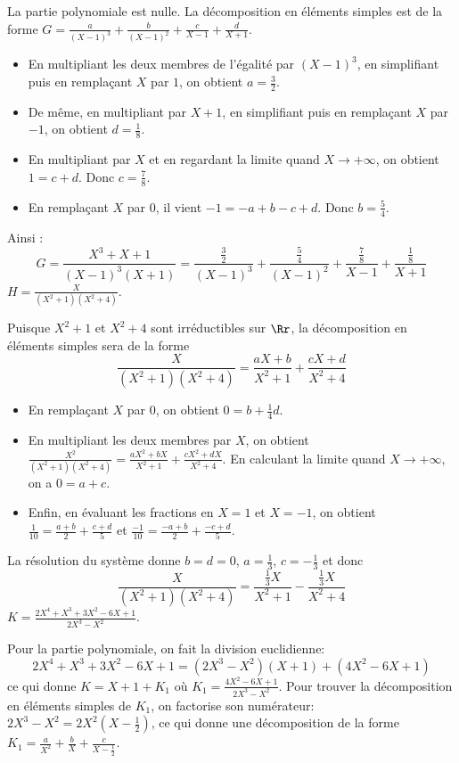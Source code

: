 {\begin{enumerate}
{La partie polynomiale est nulle. La décomposition en éléments simples est de la forme
$G=\frac{a}{(X-1)^3}+\frac{b}{(X-1)^2}+\frac{c}{X-1}+\frac{d}{X+1}$.

\begin{itemize}
\item En multipliant les deux membres de l'égalité par $(X-1)^3$, 
en simplifiant puis en remplaçant $X$ par $1$, 
on obtient $a=\frac32$.
\item De même, en multipliant par $X+1$, 
en simplifiant puis en remplaçant $X$ par $-1$, 
on obtient $d=\frac18$.
\item En multipliant par $X$ et en regardant la limite 
  quand $X\to +\infty$, on obtient $1=c+d$. Donc $c=\frac78$.
\item En remplaçant $X$ par $0$, il vient $-1=-a+b-c+d$.
  Donc $b = \frac54$.
\end{itemize}

Ainsi :
$$G = \frac{X^3+X+1}{(X-1)^3(X+1)} = \frac{\tfrac32}{(X-1)^3} + \frac{\tfrac54}{(X-1)^2} 
+ \frac{\tfrac78}{X-1}  + \frac{\tfrac18}{X+1}$$
$H=\frac{X}{(X^2+1)(X^2+4)}$.

Puisque $X^2+1$ et $X^2+4$ sont irréductibles sur $\Rr$, la décomposition en éléments simples sera de la forme 
$$\frac{X}{(X^2+1)(X^2+4)} = \frac{aX+b}{X^2+1} + \frac{cX+d}{X^2+4}$$

  \begin{itemize}
\item En remplaçant $X$ par $0$, on obtient $0=b+\frac{1}{4}d$.
\item En multipliant les deux membres par $X$, on obtient 
    $\frac{X^2}{(X^2+1)(X^2+4)} = \frac{aX^2+bX}{X^2+1} + \frac{cX^2+dX}{X^2+4}$.
    En calculant la limite quand $X\to +\infty$, on a $0=a+c$.
\item Enfin, en évaluant les fractions en $X=1$ et $X=-1$, 
    on obtient $\frac{1}{10}=\frac{a+b}{2}+\frac{c+d}{5}$ et 
    $\frac{-1}{10}=\frac{-a+b}{2}+\frac{-c+d}{5}$.
  \end{itemize}

La résolution du système donne $b=d=0$, $a=\frac{1}{3}$, $c=-\frac{1}{3}$ et donc 
$$\frac{X}{(X^2+1)(X^2+4)} = \frac{\frac{1}{3}X}{X^2+1} - \frac{\frac{1}{3}X}{X^2+4}$$
$K=\frac{2X^4+X^3+3X^2-6X+1}{2X^3-X^2}$.

Pour la partie polynomiale, on fait la division euclidienne:
$$2X^4+X^3+3X^2-6X+1=(2X^3-X^2)(X+1)+(4X^2-6X+1)$$ 
ce qui donne 
$K=X+1+K_1$ où $K_1=\frac{4X^2-6X+1}{2X^3-X^2}$.
Pour trouver la décomposition en éléments simples de $K_1$, on factorise son numérateur: 
$2X^3-X^2=2X^2(X-\frac{1}{2})$, ce qui donne une décomposition de la forme
$K_1=\frac{a}{X^2}+\frac{b}{X}+\frac{c}{X-\frac{1}{2}}$.

}
\end{enumerate}}
